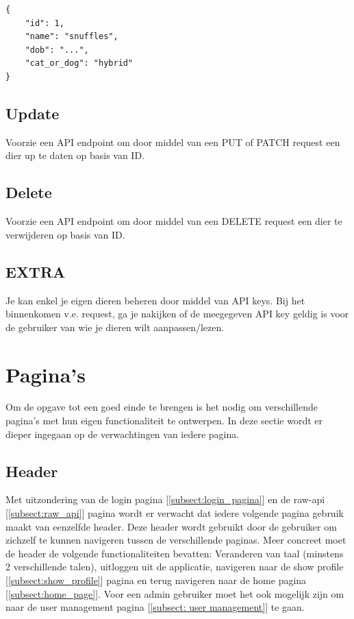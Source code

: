 \documentclass{article}
\begin{document}
\begin{verbatim}
{
    "id": 1,
    "name": "snuffles",
    "dob": "...",
    "cat_or_dog": "hybrid"
}
\end{verbatim}


\subsection{Update}
Voorzie een API endpoint om door middel van een PUT of PATCH request een dier up te daten op basis van ID.

\subsection{Delete}
Voorzie een API endpoint om door middel van een DELETE request een dier te verwijderen op basis van ID.

\subsection{EXTRA}
Je kan enkel je eigen dieren beheren door middel van API keys. Bij het binnenkomen v.e. request, ga je nakijken of de meegegeven API key geldig is voor de gebruiker van wie je dieren wilt aanpassen/lezen.

\section{Pagina's}
Om de opgave tot een goed einde te brengen is het nodig om verschillende pagina's met hun eigen functionaliteit te ontwerpen. In deze sectie wordt er dieper ingegaan op de verwachtingen van iedere pagina.

\subsection{Header}
Met uitzondering van de login pagina [\ref{subsect:login_pagina}] en de raw-api [\ref{subsect:raw_api}] pagina wordt er verwacht dat iedere volgende pagina gebruik maakt van eenzelfde header. Deze header wordt gebruikt door de gebruiker om zichzelf te kunnen navigeren tussen de verschillende paginas. Meer concreet moet de header de volgende functionaliteiten bevatten: Veranderen van taal (minstens 2 verschillende talen), uitloggen uit de applicatie,  navigeren naar de show profile [\ref{subsect:show_profile}] pagina en terug navigeren naar de home pagina [\ref{subsect:home_page}]. Voor een admin gebruiker moet het ook mogelijk zijn om naar de user management pagina [\ref{subsect: user management}] te gaan.
\end{document}

